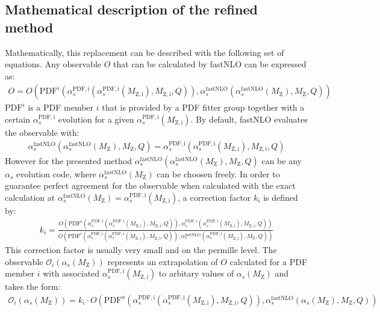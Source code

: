 \documentclass{PoS}
\begin{document}
\subsection{Mathematical description of the refined method}

Mathematically, this replacement can be described with the following set of equations.
Any observable $O$ that can be calculated by fastNLO can be expressed as:
\begin{eqnarray}
O = O(\mathrm{PDF}^i(
	\alpha_s^\mathrm{PDF,i}(\alpha_s^\mathrm{PDF,i}(M_\mathrm{Z,i}), M_\mathrm{Z,i}, Q)),
	\alpha_s^\mathrm{fastNLO}(\alpha_s^\mathrm{fastNLO}(M_\mathrm{Z}), M_\mathrm{Z}, Q))
\end{eqnarray}
$\mathrm{PDF}^i$ is a PDF member $i$ that is provided by a PDF fitter group together with
a certain $\alpha_s^\mathrm{PDF,i}$ evolution for a given $\alpha_s^\mathrm{PDF,i}(M_\mathrm{Z,i})$.
By default, fastNLO evaluates the observable with:
\begin{eqnarray}
\alpha_s^\mathrm{fastNLO}(\alpha_s^\mathrm{fastNLO}(M_\mathrm{Z}), M_\mathrm{Z}, Q) = 
\alpha_s^\mathrm{PDF,i}(\alpha_s^\mathrm{PDF,i}(M_\mathrm{Z,i}), M_\mathrm{Z,i}, Q)
\end{eqnarray}
However for the presented method $\alpha_s^\mathrm{fastNLO}(\alpha_s^\mathrm{fastNLO}(M_\mathrm{Z}), M_\mathrm{Z}, Q)$
can be any $\alpha_s$ evolution code, where $\alpha_s^\mathrm{fastNLO}(M_\mathrm{Z})$ can be choosen freely.
In order to guarantee perfect agreement for the observable when calculated with
the exact calculation at $\alpha_{s}^\mathrm{fastNLO}(M_\mathrm{Z}) = \alpha_s^\mathrm{PDF,i}(M_\mathrm{Z,i})$,
a correction factor $k_i$ is defined by:
\begin{eqnarray}
k_i = \frac{
	O(\mathrm{PDF}^i(
		\alpha_s^\mathrm{PDF,i}(\alpha_s^\mathrm{PDF,i}(M_\mathrm{Z,i}), M_\mathrm{Z,i}, Q)),
		\alpha_s^\mathrm{PDF,i}(\alpha_s^\mathrm{PDF,i}(M_\mathrm{Z,i}), M_\mathrm{Z,i}, Q))
	}{
	O(\mathrm{PDF}^i(
		\alpha_s^\mathrm{PDF,i}(\alpha_s^\mathrm{PDF,i}(M_\mathrm{Z,i}), M_\mathrm{Z,i}, Q)),
		\alpha_s^\mathrm{fastNLO}(\alpha_s^\mathrm{PDF,i}(M_\mathrm{Z,i}), M_\mathrm{Z}, Q))
	}
\end{eqnarray}
This correction factor is usually very small and on the permille level.
The observable $\mathcal{O}_i(\alpha_s(M_\mathrm{Z}))$ represents an extrapolation of $O$
calculated for a PDF member $i$ with associated $\alpha_s^\mathrm{PDF,i}(M_\mathrm{Z,i})$
to arbitary values of $\alpha_s(M_\mathrm{Z})$ and takes the form:
\begin{eqnarray}
\mathcal{O}_i(\alpha_s(M_\mathrm{Z})) = k_i \cdot O(\mathrm{PDF}^a(
		\alpha_s^\mathrm{PDF,i}(\alpha_s^\mathrm{PDF,i}(M_\mathrm{Z,i}), M_\mathrm{Z,i}, Q)),
		\alpha_s^\mathrm{fastNLO}(\alpha_s(M_\mathrm{Z}), M_\mathrm{Z}, Q))
\end{eqnarray}
\end{document}
